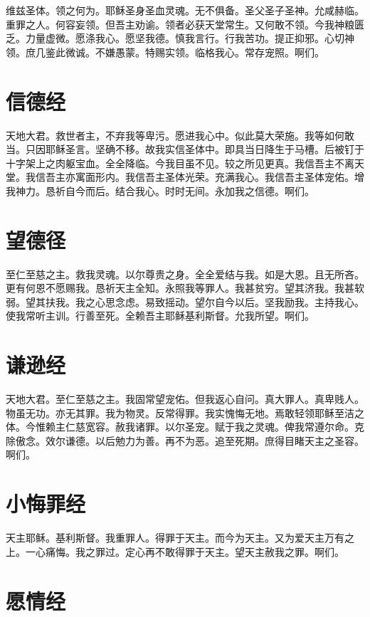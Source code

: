 \documentclass[UTF8,17pt]{ctexart}
\begin{document}
维兹圣体。领之何为。耶稣圣⾝圣⾎灵魂。⽆不俱备。圣⽗圣⼦圣神。允咸赫临。重罪之⼈。何容妄领。但吾主劝谕。领者必获天堂常⽣。又何敢不领。今我神粮匮乏。⼒量虚微。愿涤我⼼。愿坚我德。慎我⾔⾏。⾏我苦功。提正抑邪。⼼切神领。庶⼏鉴此微诚。不嫌愚蒙。特赐实领。临格我⼼。常存宠照。啊们。

\section{信德经}

天地⼤君。救世者主，不弃我等卑污。愿进我⼼中。似此莫⼤荣施。我等如何敢当。只因耶稣圣⾔。坚确不移。故我实信圣体中。即具当⽇降⽣于马槽。后被钉于⼗字架上之⾁躯宝⾎。全全降临。今我⽬虽不见。较之所见更真。我信吾主不离天堂。我信吾主亦寓⾯形内。我信吾主圣体光荣。充满我⼼。我信吾主圣体宠佑。增我神⼒。恳祈⾃今⽽后。结合我⼼。时时⽆间。永加我之信德。啊们。

\section{望德径}

⾄仁⾄慈之主。救我灵魂。以尔尊贵之⾝。全全爱结与我。如是⼤恩。且⽆所吝。更有何恩不愿赐我。恳祈天主全知。永照我等罪⼈。我甚贫穷。望其济我。我甚软弱。望其扶我。我之⼼思念虑。易致摇动。望尔⾃今以后。坚我励我。主持我⼼。使我常听主训。⾏善⾄死。全赖吾主耶稣基利斯督。允我所望。啊们。

\section{谦逊经}

天地⼤君。⾄仁⾄慈之主。我固常望宠佑。但我返⼼⾃问。真⼤罪⼈。真卑贱⼈。物虽⽆功。亦⽆其罪。我为物灵。反常得罪。我实愧悔⽆地。焉敢轻领耶稣⾄洁之体。今惟赖主仁慈宽容。赦我诸罪。以尔圣宠。赋于我之灵魂。俾我常遵尔命。克除傲念。效尔谦德。以后勉⼒为善。再不为恶。追⾄死期。庶得⽬睹天主之圣容。啊们。

\section{⼩悔罪经}

天主耶稣。基利斯督。我重罪⼈。得罪于天主。⽽今为天主。又为爱天主万有之上。⼀⼼痛悔。我之罪过。定⼼再不敢得罪于天主。望天主赦我之罪。啊们。

\section{愿情经}
\end{document}

